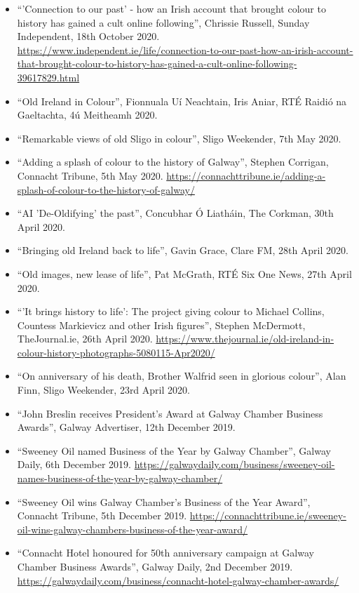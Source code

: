 \documentclass[10pt,a4paper]{res} %
\begin{document}
\begin{resume}
{\begin{itemize}
\item ``'Connection to our past' - how an Irish account that brought colour to history has gained a cult online following'', Chrissie Russell, Sunday Independent, 18th October 2020. \url{https://www.independent.ie/life/connection-to-our-past-how-an-irish-account-that-brought-colour-to-history-has-gained-a-cult-online-following-39617829.html}
\item ``Old Ireland in Colour'', Fionnuala U\'{i} Neachtain, Iris Aniar, RT\'{E} Raidi\'{o} na Gaeltachta, 4\'{u} Meitheamh 2020.
\item ``Remarkable views of old Sligo in colour'', Sligo Weekender, 7th May 2020.
\item ``Adding a splash of colour to the history of Galway'', Stephen Corrigan, Connacht Tribune, 5th May 2020. \url{https://connachttribune.ie/adding-a-splash-of-colour-to-the-history-of-galway/}
\item ``AI 'De-Oldifying' the past'', Concubhar \'{O} Liath\'{a}in, The Corkman, 30th April 2020.
\item ``Bringing old Ireland back to life'', Gavin Grace, Clare FM, 28th April 2020.
\item ``Old images, new lease of life'', Pat McGrath, RT\'{E} Six One News, 27th April 2020.
\item ``'It brings history to life': The project giving colour to Michael Collins, Countess Markievicz and other Irish figures'', Stephen McDermott, TheJournal.ie, 26th April 2020. \url{https://www.thejournal.ie/old-ireland-in-colour-history-photographs-5080115-Apr2020/}
\item ``On anniversary of his death, Brother Walfrid seen in glorious colour'', Alan Finn, Sligo Weekender, 23rd April 2020.
\item ``John Breslin receives President's Award at Galway Chamber Business Awards'', Galway Advertiser, 12th December 2019.
\item ``Sweeney Oil named Business of the Year by Galway Chamber'', Galway Daily, 6th December 2019. \url{https://galwaydaily.com/business/sweeney-oil-names-business-of-the-year-by-galway-chamber/}
\item ``Sweeney Oil wins Galway Chamber's Business of the Year Award'', Connacht Tribune, 5th December 2019. \url{https://connachttribune.ie/sweeney-oil-wins-galway-chambers-business-of-the-year-award/}
\item ``Connacht Hotel honoured for 50th anniversary campaign at Galway Chamber Business Awards'', Galway Daily, 2nd December 2019. \url{https://galwaydaily.com/business/connacht-hotel-galway-chamber-awards/}

\end{itemize}}
\end{resume}
\end{document}
